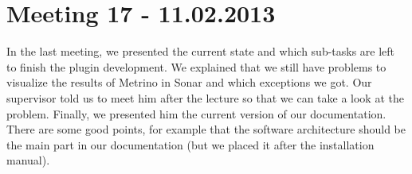 \section{Meeting 17 - 11.02.2013}
In the last meeting, we presented the current state and which sub-tasks are left to finish the plugin development. We explained that we still have problems to visualize the results of Metrino in Sonar and which exceptions we got. Our supervisor told us to meet him after the lecture so that we can take a look at the problem. Finally, we presented him the current version of our documentation. There are some good points, for example that the software architecture should be the main part in our documentation (but we placed it after the installation manual).